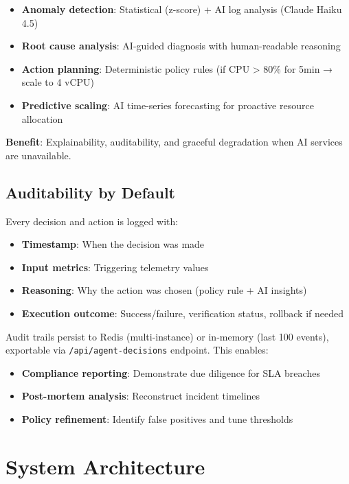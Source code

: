 \documentclass[11pt,a4paper]{article}
\begin{document}
\begin{itemize}
    \item \textbf{Anomaly detection}: Statistical (z-score) + AI log analysis (Claude Haiku 4.5)
    \item \textbf{Root cause analysis}: AI-guided diagnosis with human-readable reasoning
    \item \textbf{Action planning}: Deterministic policy rules (if CPU > 80\% for 5min → scale to 4 vCPU)
    \item \textbf{Predictive scaling}: AI time-series forecasting for proactive resource allocation
\end{itemize}

\textbf{Benefit}: Explainability, auditability, and graceful degradation when AI services are unavailable.

\subsection{Auditability by Default}

Every decision and action is logged with:
\begin{itemize}
    \item \textbf{Timestamp}: When the decision was made
    \item \textbf{Input metrics}: Triggering telemetry values
    \item \textbf{Reasoning}: Why the action was chosen (policy rule + AI insights)
    \item \textbf{Execution outcome}: Success/failure, verification status, rollback if needed
\end{itemize}

Audit trails persist to Redis (multi-instance) or in-memory (last 100 events), exportable via \texttt{/api/agent-decisions} endpoint. This enables:
\begin{itemize}
    \item \textbf{Compliance reporting}: Demonstrate due diligence for SLA breaches
    \item \textbf{Post-mortem analysis}: Reconstruct incident timelines
    \item \textbf{Policy refinement}: Identify false positives and tune thresholds
\end{itemize}

\section{System Architecture}
\end{document}
